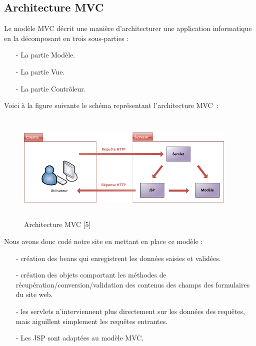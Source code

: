 \documentclass[11.5pt]{report}
\begin{document}
\subsection{Architecture MVC }
Le modèle MVC décrit une manière d’architecturer une application informatique en la décomposant en trois sous-parties :\\
\begin{itemize}
	\item [-] La partie Modèle.
	\item [-] La partie Vue.
	\item [-] La partie Contrôleur.
\end{itemize}
Voici à la figure suivante le schéma représentant l’architecture MVC : \\
\begin{figure}[h]
	
	\begin{center}
		\includegraphics[width=300pt,height=150pt]{mvc.png} 
		\caption{Architecture MVC [5]}
	\end{center}
	
\end{figure}
\newpage
Nous avons donc codé notre site en mettant en place ce modèle :\\
\begin{itemize}
	\item [-] création des beans qui enregistrent les données saisies et validées.
	\item [-] création des objets comportant les méthodes de récupération/conversion/validation des contenus des champs des formulaires du site web.
	\item [-] les servlets n'interviennent plus directement sur les données des requêtes, mais aiguillent simplement les requêtes entrantes. 
	\item [-] Les JSP sont adaptées au modèle MVC.
\end{itemize}
\end{document}
